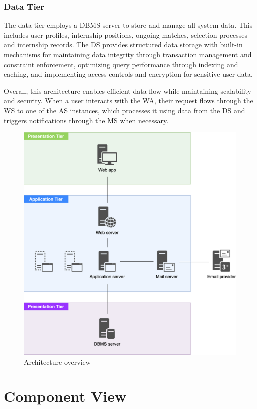 \subsubsection{Data Tier}
The data tier employs a DBMS server to store and manage all system data.
This includes user profiles, internship positions, ongoing matches, selection processes and internship records.
The DS provides structured data storage with built-in mechanisms for maintaining data integrity through transaction management and constraint enforcement, optimizing query performance through indexing and caching, and implementing access controls and encryption for sensitive user data.

Overall, this architecture enables efficient data flow while maintaining scalability and security.
When a user interacts with the WA, their request flows through the WS to one of the AS instances, which processes it using data from the DS and triggers notifications through the MS when necessary.

\begin{figure}[h]
    \centering
    \includegraphics[width=14cm]{images/architecture.png}
    \caption{Architecture overview}
\end{figure}

\section{Component View}
